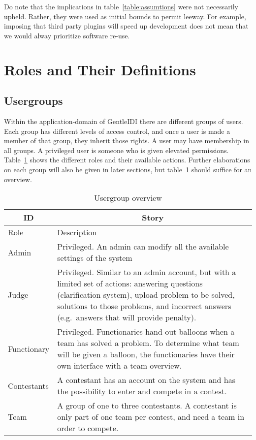 Do note that the implications in table~\ref{table:assumtions} were not necessarily upheld.
Rather, they were used as initial bounds to permit leeway. For example,
imposing that third party plugins will speed up development does not
mean that we would alway prioritize software re-use.

\section{Roles and Their Definitions}
\subsection{Usergroups}
Within the application-domain of
GentleIDI there are different
groups of users. Each group has different levels of access control, and
once a user is made a member of that group, they inherit those rights.
A user may have membership in all groups. A privileged user is someone
who is given elevated permissions. Table~\ref{table:usegroup} shows the
different roles and their available actions. Further elaborations on
each group will also be given in later sections, but table~\ref{table:usegroup} should
suffice for an overview.

\begin{longtable}{|p{}|p{}|}
\caption{Usergroup overview} \label{table:usegroup}\\
\hline
\multicolumn{1}{|c|}{\textbf{ID}} &
\multicolumn{1}{c|}{\textbf{Story}} \\
\hline
Role &
Description\\\hline
Admin &
Privileged. An admin can modify all the available settings of the
system\\\hline
Judge &
Privileged. Similar to an admin account, but with a limited set of
actions: answering questions (clarification system), upload problem to be
solved, solutions to those problems, and incorrect answers (e.g.\ answers
that will provide penalty).\\\hline
Functionary &
Privileged. Functionaries hand out balloons when a team has solved a
problem. To determine what team will be given a balloon, the functionaries
have their own interface with a team overview.\\\hline
Contestants &
A contestant has an account on the system and has the possibility to
enter and compete in a contest. \\\hline
Team &
A group of one to three contestants. A contestant is only part of one
team per contest, and need a team in order to compete. \\\hline

\end{longtable}


